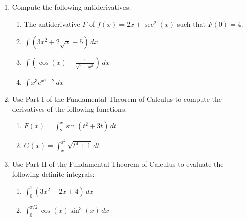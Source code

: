 \documentclass[12pt]{article}
\newcommand{\points}[1]{\marginpar{\hspace{24pt}[#1]}}
\newcommand{\di}{\displaystyle}
\begin{document}
 \begin{enumerate}
 \item  Compute the following antiderivatives:
 \begin{enumerate}
 \item The antiderivative $F$ of $f(x) = 2x+\sec^2(x)$ such that $F(0)=4$. \points{3}
 
 \vspace{4.5cm}
 
 \item $\di \int (3x^2+2\sqrt{x}-5)\,dx$\points{3}
 
 \vspace{4.5cm}
 
 \item $\di \int \left(\cos(x)-\frac{1}{\sqrt{1-x^2}}\right)\,dx$ \points{3}
 
 \vspace{4.5cm}
 
 \item $\di \int x^3 e^{x^4+2}\,dx$ \points{3}
 \end{enumerate}
 \newpage
 
 \item Use Part I of the Fundamental Theorem of Calculus to compute the derivatives of the following functions:
 \begin{enumerate}
 \item $\di F(x) = \int_2^x \sin(t^2+3t)\,dt$ \points{2}
 
 \vspace{3cm}
 
 \item $\di G(x) = \int_x^{x^2}\sqrt{t^4+1}\,dt$ \points{3}
 
 \vspace{4cm}
  \end{enumerate}
 \item Use Part II of the Fundamental Theorem of Calculus to evaluate the following definite integrals:
 \begin{enumerate}
 \item $\di \int_0^1\left(3x^2-2x+4\right)\,dx$ \points{3}
 
 \vspace{4cm}
 
 \item $\di \int_0^{\pi/2}\cos(x)\sin^3(x)\,dx$ \points{4}
 \end{enumerate}
\end{enumerate}
\end{document}
